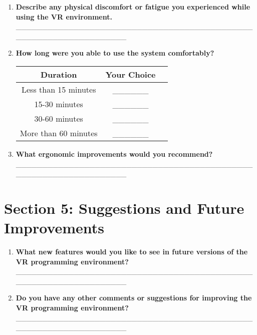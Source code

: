 \documentclass[12pt]{article}
\begin{document}
\begin{enumerate}
    \item \textbf{Describe any physical discomfort or fatigue you experienced while using the VR environment.} \\
    \_\_\_\_\_\_\_\_\_\_\_\_\_\_\_\_\_\_\_\_\_\_\_\_\_\_\_\_\_\_\_\_\_\_\_\_\_\_\_\_\_\_\_\_\_\_\_\_\_\_\_\_\_\_\_\_\_\_\_\_\_\_\_\_\_\_
    
    \item \textbf{How long were you able to use the system comfortably?}
    \begin{table}[h!]
        \centering
        \begin{tabular}{|c|c|c|}
            \hline
            \textbf{Duration}  & \textbf{Your Choice} \\
            \hline
            Less than 15 minutes & \_\_\_\_\_\_ \\
            \hline
            15-30 minutes &  \_\_\_\_\_\_ \\
            \hline
            30-60 minutes &  \_\_\_\_\_\_ \\
            \hline
            More than 60 minutes & \_\_\_\_\_\_ \\
            \hline
        \end{tabular}
    \end{table}
    
    \item \textbf{What ergonomic improvements would you recommend?} \\
    \_\_\_\_\_\_\_\_\_\_\_\_\_\_\_\_\_\_\_\_\_\_\_\_\_\_\_\_\_\_\_\_\_\_\_\_\_\_\_\_\_\_\_\_\_\_\_\_\_\_\_\_\_\_\_\_\_\_\_\_\_\_\_\_\_\_
\end{enumerate}

\section*{Section 5: Suggestions and Future Improvements}
\begin{enumerate}
    \item \textbf{What new features would you like to see in future versions of the VR programming environment?} \\
    \_\_\_\_\_\_\_\_\_\_\_\_\_\_\_\_\_\_\_\_\_\_\_\_\_\_\_\_\_\_\_\_\_\_\_\_\_\_\_\_\_\_\_\_\_\_\_\_\_\_\_\_\_\_\_\_\_\_\_\_\_\_\_\_\_\_
    \item \textbf{Do you have any other comments or suggestions for improving the VR programming environment?} \\
    \_\_\_\_\_\_\_\_\_\_\_\_\_\_\_\_\_\_\_\_\_\_\_\_\_\_\_\_\_\_\_\_\_\_\_\_\_\_\_\_\_\_\_\_\_\_\_\_\_\_\_\_\_\_\_\_\_\_\_\_\_\_\_\_\_\_
\end{enumerate}
\end{document}
